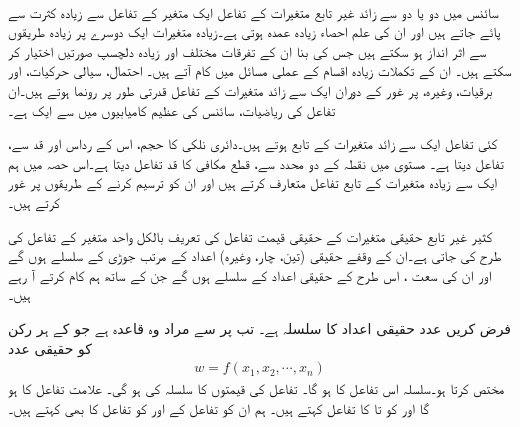 \\
سائنس میں دو یا دو سے زائد غیر تابع  متغیرات کے تفاعل    ایک متغیر کے تفاعل سے زیادہ کثرت سے پائے جاتے ہیں اور ان کی علم   احصاء  زیادہ  عمدہ   ہوتی  ہے۔زیادہ متغیرات ایک دوسرے پر زیادہ طریقوں سے اثر انداز ہو سکتے ہیں جس کی بنا ان کے تفرقات    مختلف اور زیادہ دلچسپ  صورتیں اختیار  کر سکتے ہیں۔ ان کے تکملات  زیادہ اقسام کے عملی  مسائل میں کام آتے ہیں۔ احتمال،  سیالی حرکیات، اور برقیات، وغیرہ،    پر غور کے دوران  ایک سے زائد متغیرات  کے تفاعل قدرتی طور پر رونما ہوتے ہیں۔ان تفاعل کی  ریاضیات، سائنس کی عظیم  کامیابیوں میں  سے ایک ہے۔

کئی تفاعل ایک سے زائد متغیرات کے تابع  ہوتے ہیں۔دائری نلکی کا حجم،  اس    کے رداس اور قد سے،   تفاعل     دیتا ہے۔ مستوی  میں نقطہ  کے دو محدد سے،   قطع مکافی     کا قد  تفاعل  دیتا ہے۔اس حصہ میں ہم ایک سے زیادہ متغیرات کے تابع تفاعل متعارف کرتے ہیں  اور ان کو ترسیم کرنے کے طریقوں پر غور کرتے ہیں۔

کثیر غیر تابع حقیقی متغیرات  کے حقیقی قیمت تفاعل کی تعریف  بالکل واحد متغیر کے تفاعل کی طرح کی جاتی ہے۔ان کے وقفے  حقیقی   (تین، چار، وغیرہ)    اعداد کے  مرتب جوڑی  کے سلسلے ہوں گے اور ان  کی  سعت  ، اس طرح  کے حقیقی اعداد کے سلسلے ہوں گے جن کے ساتھ ہم کام کرتے آ رہے ہیں۔

فرض کریں  عدد حقیقی اعداد  کا سلسلہ  ہے۔  تب  پر   سے مراد وہ قاعدہ ہے جو  کے ہر رکن کو حقیقی عدد
\begin{align*}
w=f(x_1,x_2,\cdots,x_n)
\end{align*}
مختص کرتا ہو۔سلسلہ  اس تفاعل کا  ہو گا۔  تفاعل   کی   قیمتوں کا سلسلہ   کی  ہو گی۔ علامت  تفاعل  کا  ہو گا اور  کو      تا    کا تفاعل کہتے ہیں۔ ہم  ان  کو تفاعل کے  اور  کو تفاعل کا   بھی کہتے ہیں۔

